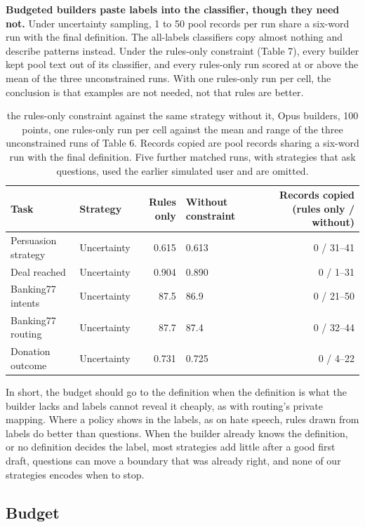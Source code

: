 \documentclass[11pt]{article}
\begin{document}
\textbf{Budgeted builders paste labels into the classifier, though they need not.} Under uncertainty sampling, 1 to 50 pool records per run share a six-word run with the final definition. The all-labels classifiers copy almost nothing and describe patterns instead. Under the rules-only constraint (Table 7), every builder kept pool text out of its classifier, and every rules-only run scored at or above the mean of the three unconstrained runs. With one rules-only run per cell, the conclusion is that examples are not needed, not that rules are better.

\begin{table}[t]
\centering\small\setlength{\tabcolsep}{3.5pt}
\begin{tabularx}{\textwidth}{lLRLR}
\toprule
Task & Strategy & Rules only & Without constraint & Records copied (rules only / without) \\
\midrule
Persuasion strategy & Uncertainty & 0.615 & 0.613 & 0 / 31--41 \\
Deal reached & Uncertainty & 0.904 & 0.890 & 0 / 1--31 \\
Banking77 intents & Uncertainty & 87.5 & 86.9 & 0 / 21--50 \\
Banking77 routing & Uncertainty & 87.7 & 87.4 & 0 / 32--44 \\
Donation outcome & Uncertainty & 0.731 & 0.725 & 0 / 4--22 \\
\bottomrule
\end{tabularx}
\caption{the rules-only constraint against the same strategy without it, Opus builders, 100 points, one rules-only run per cell against the mean and range of the three unconstrained runs of Table 6. Records copied are pool records sharing a six-word run with the final definition. Five further matched runs, with strategies that ask questions, used the earlier simulated user and are omitted.}
\label{tab:7}
\end{table}

In short, the budget should go to the definition when the definition is what the builder lacks and labels cannot reveal it cheaply, as with routing's private mapping. Where a policy shows in the labels, as on hate speech, rules drawn from labels do better than questions. When the builder already knows the definition, or no definition decides the label, most strategies add little after a good first draft, questions can move a boundary that was already right, and none of our strategies encodes when to stop.

\subsection{Budget}
\end{document}

